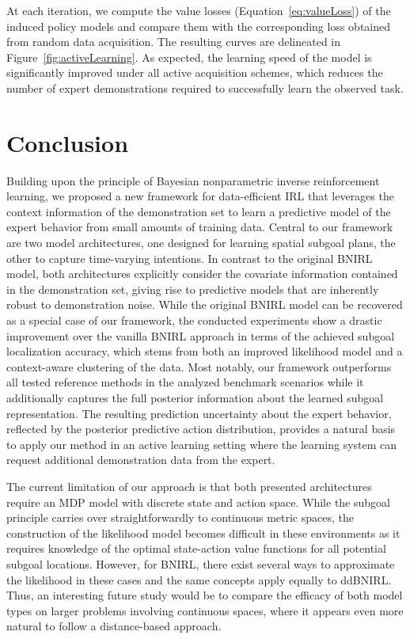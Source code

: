 \documentclass[twoside,11pt]{article}
\begin{document}
At each iteration, we compute the value losses (Equation~\ref{eq:valueLoss}) of the induced policy models and compare them with the corresponding loss obtained from random data acquisition. The resulting curves are delineated in Figure~\ref{fig:activeLearning}. As expected, the learning speed of the model is significantly improved under all active acquisition schemes, which reduces the number of expert demonstrations required to successfully %
%
learn the observed task. %
%




%
%
%




\section{Conclusion}
\label{sec:conclusion}
%
Building upon the principle of Bayesian nonparametric inverse reinforcement learning, we proposed a new framework for data-efficient IRL that %
leverages the context %
%
information of the demonstration set to learn a predictive model of the expert behavior from small amounts of training data. %
Central to our framework are two model architectures, one designed for learning spatial subgoal plans, the other %
to capture %
time-varying %
intentions. In contrast to the original BNIRL model, both architectures explicitly consider the covariate information contained in the demonstration set, giving rise to predictive models that are inherently robust to demonstration noise. While the original BNIRL model can be recovered as a special case of our framework, the conducted experiments show a drastic improvement over the vanilla BNIRL approach in terms of the achieved subgoal localization accuracy, %
which stems from both 
an improved likelihood model and a context-aware clustering of the data. Most notably, our framework outperforms all tested reference methods in the analyzed benchmark scenarios %
while it additionally captures the full posterior information about the learned subgoal representation. %
The %
resulting prediction uncertainty %
about the expert behavior, reflected by the posterior predictive action distribution, provides a natural basis to apply our method in an active learning setting where the learning 
system can request additional demonstration data from the expert. %
%
%

The current limitation of our approach is that both presented architectures require an MDP model with discrete state and action space. While the subgoal principle carries over straightforwardly to continuous metric spaces, the construction of the likelihood model becomes difficult in these environments as it requires knowledge of the optimal state-action value functions for all potential subgoal locations. However, for BNIRL, there exist several ways to approximate the likelihood in these cases \citep{michini2013scalable} and the same concepts apply equally to ddBNIRL. Thus, an interesting future study would be to compare the efficacy of both model types on larger problems involving continuous spaces, where it appears %
even more natural to follow a distance-based %
approach. %
\end{document}
